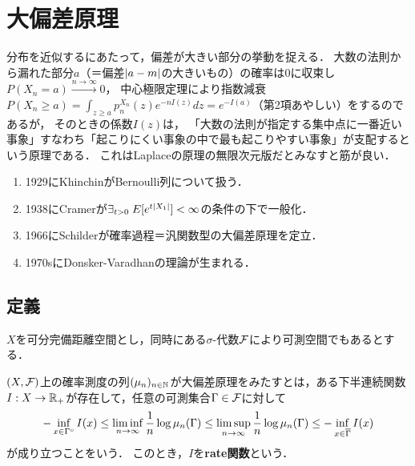 \documentclass[uplatex,dvipdfmx]{jsreport}
\begin{document}
\section{大偏差原理}

\begin{tcolorbox}[colframe=ForestGreen, colback=ForestGreen!10!white,breakable,colbacktitle=ForestGreen!40!white,coltitle=black,fonttitle=\bfseries\sffamily,
    title=無限次元空間におけるLaplace原理]
    分布を近似するにあたって，偏差が大きい部分の挙動を捉える．
    大数の法則から漏れた部分$a$（＝偏差$\lvert a-m\rvert$の大きいもの）の確率は$0$に収束し$P(X_n=a)\xrightarrow{n\to\infty}0$，
    中心極限定理により指数減衰$P(X_n\ge a)=\int_{z\ge a}p_n^{X_n}(z)e^{-nI(z)}dz=e^{-I(a)}$（第2項あやしい）をするのであるが，
    そのときの係数$I(z)$は，
    「大数の法則が指定する集中点に一番近い事象」すなわち「起こりにくい事象の中で最も起こりやすい事象」が支配するという原理である．
    これはLaplaceの原理の無限次元版だとみなすと筋が良い．
\end{tcolorbox}

\begin{history}\mbox{}
    \begin{enumerate}
        \item 1929にKhinchinがBernoulli列について扱う．
        \item 1938にCramerが$\exists_{t>0}\;E[e^{t\lvert X_1\rvert}]<\infty$の条件の下で一般化．
        \item 1966にSchilderが確率過程＝汎関数型の大偏差原理を定立．
        \item 1970sにDonsker-Varadhanの理論が生まれる．
    \end{enumerate}
\end{history}

\subsection{定義}

\begin{notation}
    $X$を可分完備距離空間とし，同時にある$\sigma$-代数$\mathcal{F}$により可測空間でもあるとする．
\end{notation}

\begin{definition}
    $(X,\mathcal{F})$上の確率測度の列$(\mu_n)_{n\in\mathbb{N}}$が大偏差原理をみたすとは，ある下半連続関数$I:X\to\mathbb{R}_+$が存在して，任意の可測集合$\Gamma\in\mathcal{F}$に対して
    \[-\inf_{x\in\Gamma^\circ}I(x)\le\liminf_{n\to\infty}\frac{1}{n}\log\mu_n(\Gamma)\le\limsup_{n\to\infty}\frac{1}{n}\log\mu_n(\Gamma)\le-\inf_{x\in\overline{\Gamma}}I(x)\]
    が成り立つことをいう．
    このとき，$I$を\textbf{rate関数}という．
\end{definition}
\end{document}
